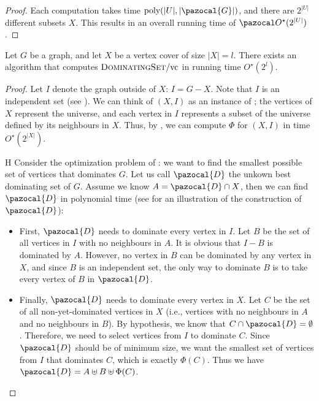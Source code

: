 {\begin{proof}
    Each computation takes time $\poly(|U|, |\pazocal{G}|)$, and there are $2^{|U|}$ different subsets $X$. This results in an overall running time of $\O^\star(2^{|U|})$.
\end{proof}



\begin{theorem}
    Let $G$ be a graph, and let $X$ be a vertex cover of size $|X| = l$. There exists an algorithm that computes $\textsc{DominatingSet}/\text{vc}$ in running time $O^\star(2^l)$.
\end{theorem}

\begin{proof}
    \def\D{\pazocal{D}}
    Let $I$ denote the graph outside of $X$: $I = G - X$. Note that $I$ is an independent set (see ). We can think of $(X, I)$ as an instance of ; the vertices of $X$ represent the universe, and each vertex in $I$ represents a subset of the universe defined by its neighbours in $X$. Thus, by , we can compute $\Phi$ for $(X, I)$ in time $O^\star(2^{|X|})$.

    \medskip
    H
    Consider the optimization problem of : we want to find the smallest possible set of vertices that dominates $G$. Let us call $\D$ the unkown best dominating set of $G$. Assume we know $A = \D \cap X$, then we can find $\D$ in polynomial time (see  for an illustration of the construction of $\D$):
    \begin{itemize}
        \item First, $\D$ needs to dominate every vertex in $I$. Let $B$ be the set of all vertices in $I$ with no neighbours in $A$. It is obvious that $I - B$ is dominated by $A$. However, no vertex in $B$ can be dominated by any vertex in $X$, and since $B$ is an independent set, the only way to dominate $B$ is to take every vertex of $B$ in $\D$.
        \item Finally, $\D$ needs to dominate every vertex in $X$. Let $C$ be the set of all non-yet-dominated vertices in $X$ (i.e., vertices with no neighbours in $A$ and no neighbours in $B$). By hypothesis, we know that $C \cap \D = \emptyset$. Therefore, we need to select vertices from $I$ to dominate $C$. Since $\D$ should be of minimum size, we want the smallest set of vertices from $I$ that dominates $C$, which is exactly $\Phi(C)$. Thus we have $\D = A \uplus B \uplus \Phi(C)$.
    \end{itemize}
    

\end{proof}}
